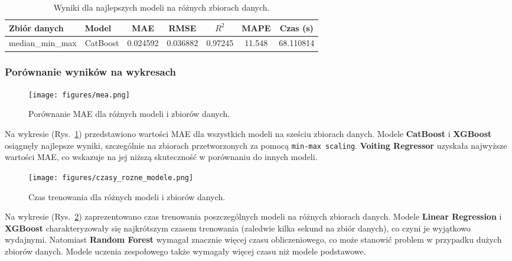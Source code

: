 \documentclass[10pt,letterpaper]{article}
\begin{document}
\begin{table}[H]
	\centering
	\caption{Wyniki dla najlepszych modeli na różnych zbiorach danych.}
	\label{tab:results}
	\begin{tabular}{|l|l|c|c|c|c|c|}
		\hline
		\textbf{Zbiór danych} & \textbf{Model} & \textbf{MAE} & \textbf{RMSE} & \textbf{\(R^2\)} & \textbf{MAPE} & \textbf{Czas (s)} \\ \hline
		median\_min\_max      & CatBoost       & 0.024592     & 0.036882      & 0.97245         & 11.548        & 68.110814            \\ \hline
	\end{tabular}
\end{table}

\subsubsection{Porównanie wyników na wykresach}

\begin{figure}[H]
	\centering
	\texttt{[image: figures/mea.png]}
	\caption{Porównanie MAE dla różnych modeli i zbiorów danych.}
	\label{fig:mae}
\end{figure}

Na wykresie (Rys.~\ref{fig:mae}) przedstawiono wartości MAE dla wszystkich modeli na sześciu zbiorach danych. Modele \textbf{CatBoost} i \textbf{XGBoost} osiągnęły najlepsze wyniki, szczególnie na zbiorach przetworzonych za pomocą \texttt{min-max scaling}. \textbf{Voiting Regressor} uzyskała najwyższe wartości MAE, co wskazuje na jej niższą skuteczność w porównaniu do innych modeli.

\begin{figure}[H]
	\centering
	\texttt{[image: figures/czasy\_rozne\_modele.png]}
	\caption{Czas trenowania dla różnych modeli i zbiorów danych.}
	\label{fig:time}
\end{figure}

Na wykresie (Rys.~\ref{fig:time}) zaprezentowano czas trenowania poszczególnych modeli na różnych zbiorach danych. Modele \textbf{Linear Regression} i \textbf{XGBoost} charakteryzowały się najkrótszym czasem trenowania (zaledwie kilka sekund na zbiór danych), co czyni je wyjątkowo wydajnymi. Natomiast \textbf{Random Forest} wymagał znacznie więcej czasu obliczeniowego, co może stanowić problem w przypadku dużych zbiorów danych. Modele uczenia zespołowego także wymagały więcej czasu niż modele podstawowe. 
\end{document}
